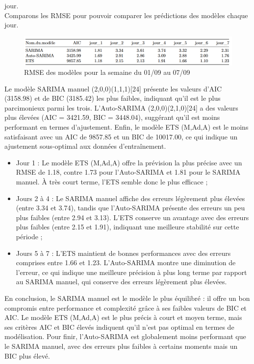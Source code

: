 \documentclass{article}
\theoremstyle{definition}
\theoremstyle{remark}
\begin{document}
jour.\newline \\
Comparons les RMSE pour pouvoir comparer les prédictions des modèles chaque jour.
\FloatBarrier
\begin{figure}[!h]
    \centering
    \includegraphics[width=1\linewidth]{fig20.png}
    \caption{RMSE des modèles pour la semaine du 01/09 au 07/09}
    \label{fig:enter-label}
\end{figure}
Le mod\`ele SARIMA manuel (2,0,0)(1,1,1)[24] pr\'esente les valeurs d'AIC (3158.98) et de BIC (3185.42) les plus faibles, indiquant qu'il est le plus parcimonieux parmi les trois. L'Auto-SARIMA (2,0,0)(2,1,0)[24] a des valeurs plus \'elev\'ees (AIC = 3421.59, BIC = 3448.04), sugg\'erant qu'il est moins performant en termes d'ajustement. Enfin, le mod\`ele ETS (M,Ad,A) est le moins satisfaisant avec un AIC de 9857.85 et un BIC de 10017.00, ce qui indique un ajustement sous-optimal aux donn\'ees d’entra\^inement.

\begin{itemize}
    \item Jour 1 : Le mod\`ele ETS (M,Ad,A) offre la pr\'evision la plus pr\'ecise avec un RMSE de 1.18, contre 1.73 pour l'Auto-SARIMA et 1.81 pour le SARIMA manuel. \`A tr\`es court terme, l'ETS semble donc le plus efficace ;
    \item Jours 2 \`a 4 : Le SARIMA manuel affiche des erreurs l\'eg\`erement plus \'elev\'ees (entre 3.34 et 3.74), tandis que l'Auto-SARIMA pr\'esente des erreurs un peu plus faibles (entre 2.94 et 3.13). L'ETS conserve un avantage avec des erreurs plus faibles (entre 2.15 et 1.91), indiquant une meilleure stabilit\'e sur cette p\'eriode ;
    \item Jours 5 \`a 7 : L'ETS maintient de bonnes performances avec des erreurs comprises entre 1.66 et 1.23. L'Auto-SARIMA montre une diminution de l'erreur, ce qui indique une meilleure pr\'ecision \`a plus long terme par rapport au SARIMA manuel, qui conserve des erreurs l\'eg\`erement plus \'elev\'ees.
\end{itemize}

En conclusion, le SARIMA manuel est le mod\`ele le plus \'equilibr\'e : il offre un bon compromis entre performance et complexit\'e gr\^ace \`a ses faibles valeurs de BIC et AIC. Le mod\`ele ETS (M,Ad,A) est le plus pr\'ecis \`a court et moyen terme, mais ses crit\`eres AIC et BIC \'elev\'es indiquent qu'il n'est pas optimal en termes de mod\'elisation. Pour finir, l'Auto-SARIMA est globalement moins performant que le SARIMA manuel, avec des erreurs plus faibles \`a certains moments mais un BIC plus \'elev\'e.
\end{document}
